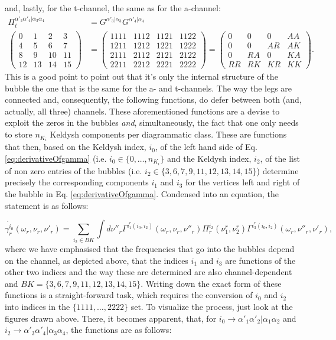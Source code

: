 \documentclass[12pt,a4paper,roman]{article}
\begin{document}
and, lastly, for the t-channel, the same as for the a-channel:
\begin{align}
\Pi_t^{\alpha'_3\alpha'_4|\alpha_3\alpha_4} &= G^{\alpha'_3|\alpha_3}G^{\alpha'_4|\alpha_4}\\
\begin{pmatrix}
0  & 1  & 2   & 3\\
4  & 5  & 6   & 7\\
8  & 9  & 10 & 11\\
12& 13&14 & 15
\end{pmatrix} &=
\begin{pmatrix}
1111 & 1112 & 1121 & 1122 \\
1211 & 1212 & 1221 & 1222\\
2111 & 2112 & 2121 & 2122\\
2211& 2212 & 2221 & 2222
\end{pmatrix} = \begin{pmatrix}
0    & 0    & 0    & AA \\
0    & 0    & AR & AK\\
0    & RA & 0    & KA\\
RR & RK & KR & KK
\end{pmatrix}.
\end{align}
This is a good point to point out that it's only the internal structure of the bubble the one that is the same for the a- and t-channels. The way the legs are connected and, consequently, the following functions, do defer between both (and, actually, all three) channels.
These aforementioned functions are a devise to exploit the zeros in the bubbles \textit{and}, simultaneously, the fact that one only needs to store $n_{K_i}$ Keldysh components per diagrammatic class. These are functions that then, based on the Keldysh index, $i_0$, of the left hand side of Eq. \ref{eq:derivativeOfgamma} (i.e. $i_0\in\{0,\dots, n_{K_i}\}$ and the Keldysh index, $i_2$, of the list of non zero entries of the bubbles (i.e. $i_2\in\{3, 6, 7, 9, 11, 12, 13, 14, 15\}$)  determine precisely the corresponding components $i_1$ and $i_3$ for the vertices left and right of the bubble in Eq. \ref{eq:derivativeOfgamma}. Condensed into an equation, the statement is as follows:

\begin{equation}
\dot{\gamma_r^{i_0}}(\omega_r, \nu_r, \nu'_r) = \sum_{i_2\in BK} \int d\nu''_r \Gamma^{i^r_1(i_0, i_2)}(\omega_r, \nu_r, \nu''_r)  \Pi_r^{i_2}(\nu_1^r, \nu_2^r)  \Gamma^{i^r_3(i_0, i_2)}(\omega_r, \nu''_r, \nu'_r),
\label{eq:fullgammaDerivative}
\end{equation}
where we have emphasised that the frequencies that go into the bubbles depend on the channel, as depicted above, that the indices $i_1$ and $i_3$ are functions of the other two indices and the way these are determined are also channel-dependent and $BK = \{3, 6, 7, 9, 11, 12, 13, 14, 15\}$.
Writing down the exact form of these functions is a straight-forward task, which requires the conversion of $i_0$ and $i_2$ into indices in the $\{1111, \dots, 2222\}$ set. To visualize the process, just look at the figures drawn above. There, it becomes apparent, that, for $i_0 \rightarrow \alpha'_1\alpha'_2|\alpha_1\alpha_2$ and $i_2 \rightarrow \alpha'_3\alpha'_4|\alpha_3\alpha_4$, the functions are as follows:
\end{document}
